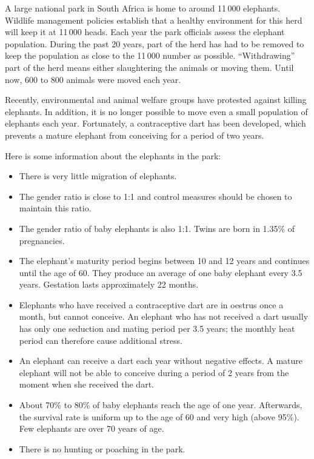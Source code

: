 A large national park in South Africa is home to around 11\,000 elephants. 
Wildlife management policies establish that a healthy environment for this herd will keep it at 11\,000 heads. 
Each year the park officials assess the elephant population. 
During the past 20 years, part of the herd has had to be removed to keep the population as close to the 11\,000 number as possible. 
``Withdrawing'' part of the herd means either slaughtering the animals or moving them. 
Until now, 600 to 800 animals were moved each year.

Recently, environmental and animal welfare groups have protested against killing elephants. 
In addition, it is no longer possible to move even a small population of elephants each year. 
Fortunately, a contraceptive dart has been developed, which prevents a mature elephant from conceiving for a period of two years.

Here is some information about the elephants in the park:
\begin{emphbox}[]
\begin{itemize}
	\item There is very little migration of elephants.
	\item The gender ratio is close to 1:1 and control measures should be chosen to maintain this ratio.
	\item The gender ratio of baby elephants is also 1:1. Twins are born in 1.35\% of pregnancies.
	\item The elephant's maturity period begins between 10 and 12 years and continues until the age of 60. They produce an average of one baby elephant every 3.5 years. Gestation lasts approximately 22 months.
	\item Elephants who have received a contraceptive dart are in oestrus once a month, but cannot conceive. An elephant who has not received a dart usually has only one seduction and mating period per 3.5 years; the monthly heat period can therefore cause additional stress.
	\item An elephant can receive a dart each year without negative effects. A mature elephant will not be able to conceive during a period of 2 years from the moment when she received the dart.
	\item About 70\% to 80\% of baby elephants reach the age of one year. Afterwards, the survival rate is uniform up to the age of 60 and very high (above 95\%). Few elephants are over 70 years of age.
	\item There is no hunting or poaching in the park.
\end{itemize}
\end{emphbox}

